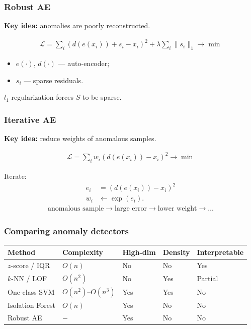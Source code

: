 \documentclass[]{beamer}
\begin{document}
\begin{frame}[fragile]
\frametitle{Robust AE}
\textbf{Key idea:} anomalies are poorly reconstructed.

\begin{align*}
  \mathcal{L} = \sum_i \left( d\left(e(x_i)\right) + s_i - x_i \right)^2 + \lambda \sum_i \|s_i\|_1\to \min
\end{align*}
\begin{itemize}
  \item $e(\cdot)$, $d(\cdot)$ --- auto-encoder;
  \item $s_i$ --- sparse residuals.
\end{itemize}

$l_1$ regularization forces $S$ to be sparse. 

\end{frame}

\begin{frame}[fragile]
\frametitle{Iterative AE}
\textbf{Key idea:} reduce weights of anomalous samples.

\begin{align*}
  \mathcal{L} = \sum_i w_i \left( d\left(e(x_i)\right) - x_i \right)^2 \to \min
\end{align*}

Iterate:
\begin{align*}
  e_i &= \left( d\left(e(x_i)\right) - x_i \right)^2\\
  w_i &\leftarrow \exp\left(e_i\right).
\end{align*}
\vspace{-2em}
\begin{multline*}
  \text{anomalous sample} \rightarrow \text{large error} \rightarrow \text{lower weight} \rightarrow \ldots
\end{multline*}

\end{frame}

\begin{frame}[fragile]
\frametitle{Comparing anomaly detectors}
\begin{center}
{\footnotesize\setlength\tabcolsep{4pt}
\begin{tabular}{lllll}
\toprule
\textbf{Method} & \textbf{Complexity} & \textbf{High-dim} & \textbf{Density} & \textbf{Interpretable} \\
\midrule
$z$-score / IQR  & $O(n)$             & No  & No  & Yes \\
$k$-NN / LOF     & $O(n^2)$           & No  & Yes & Partial \\
One-class SVM    & $O(n^2)$--$O(n^3)$ & Yes & Yes & No \\
Isolation Forest & $O(n)$             & Yes & No  & No \\
Robust AE & $-$             & Yes & No  & No \\
\bottomrule
\end{tabular}}
\end{center}

\end{frame}
\end{document}
